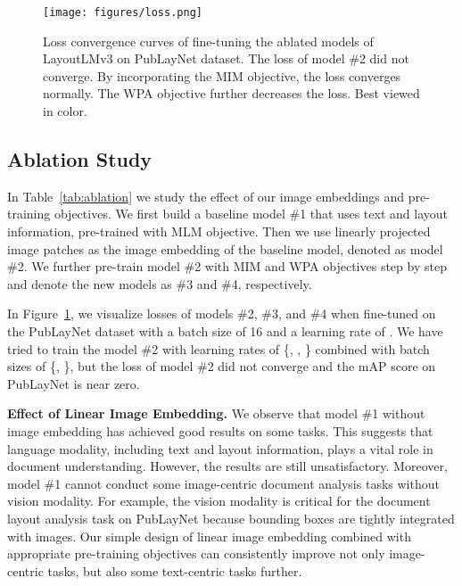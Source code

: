 \documentclass[sigconf]{acmart}
\begin{document}
\begin{figure}[t]
    \centering
    \texttt{[image: figures/loss.png]}
    \caption{Loss convergence curves of fine-tuning the ablated models of  LayoutLMv3 on PubLayNet dataset.
    The loss of model \#2 did not converge.
    By incorporating the MIM objective, the loss converges normally.
    The WPA objective further decreases the loss.
    Best viewed in color.
    }
    \label{fig:loss}
\end{figure} 

\subsection{Ablation Study}\label{subsec:ablation_study}
In Table~\ref{tab:ablation} we study the effect of our image embeddings and pre-training objectives.
We first build a baseline model \#1 that uses text and layout information, pre-trained with MLM objective.
Then we use linearly projected image patches as the image embedding of the baseline model, denoted as model \#2.
We further pre-train model \#2 with MIM and WPA objectives step by step and denote the new models as \#3 and \#4, respectively.


In Figure~\ref{fig:loss}, we visualize losses of models \#2, \#3, and \#4 when fine-tuned on the PubLayNet dataset with a batch size of 16 and a learning rate of .
We have tried to train the model \#2 with learning rates of \{, , \} combined with batch sizes of \{, \}, but the loss of model \#2 did not converge and the mAP score on PubLayNet is near zero.

\noindent \textbf{Effect of Linear Image Embedding.}
We observe that model \#1 without image embedding has achieved good results on some tasks.
This suggests that language modality, including text and layout information, plays a vital role in document understanding.
However, the results are still unsatisfactory.
Moreover, model \#1 cannot conduct some image-centric document analysis tasks without vision modality.
For example, the vision modality is critical for the document layout analysis task on PubLayNet because bounding boxes are tightly integrated with images.
Our simple design of linear image embedding combined with appropriate pre-training objectives can consistently improve not only image-centric tasks, but also some text-centric tasks further.
\end{document}
